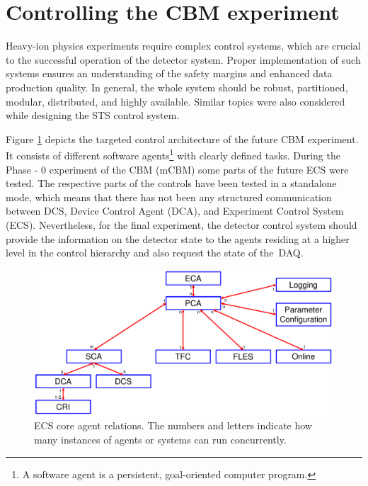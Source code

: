 \section{Controlling the CBM experiment}

Heavy-ion physics experiments require complex control systems, which are crucial to the successful operation of the detector system. Proper implementation of such systems ensures an understanding of the safety margins and enhanced data production quality. In general, the whole system should be robust, partitioned, modular, distributed, and highly available. Similar topics were also considered while designing the \gls{STS} control system.

Figure \ref{fig_sim} depicts the targeted control architecture of the future \gls{CBM} experiment. It consists of different software agents\footnote{A software agent is a persistent, goal-oriented computer program.} with clearly defined tasks. During the Phase - 0 experiment of the \gls{CBM} (\gls{mCBM}) some parts of the future \gls{ECS} were tested. The respective parts of the controls have been tested in a standalone mode, which means that there has not been any structured communication between \gls{DCS}, Device Control Agent (\gls{DCA}), and Experiment Control System (\gls{ECS}). Nevertheless, for the final experiment, the detector control system should provide the information on the detector state to the agents residing at a higher level in the control hierarchy and also request the state of the~\gls{DAQ}.

\begin{figure}[!h]
\centering
\includegraphics[width=0.8\columnwidth]{Chapter3/Controls/images/AgentsRelations_V2.pdf}
\caption{\gls{ECS} core agent relations. The numbers and letters indicate how many instances of agents or systems can run concurrently.}
\label{fig_sim}
\end{figure}

